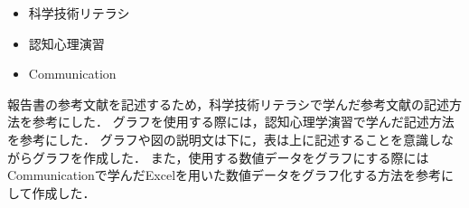 \documentclass[../report]{subfiles}
\begin{document}
\begin{itemize}
    \item 科学技術リテラシ
    \item 認知心理演習
    \item Communication
\end{itemize}
報告書の参考文献を記述するため，科学技術リテラシで学んだ参考文献の記述方法を参考にした．
グラフを使用する際には，認知心理学演習で学んだ記述方法を参考にした．
グラフや図の説明文は下に，表は上に記述することを意識しながらグラフを作成した．
また，使用する数値データをグラフにする際にはCommunicationで学んだExcelを用いた数値データをグラフ化する方法を参考にして作成した．
\end{document}
